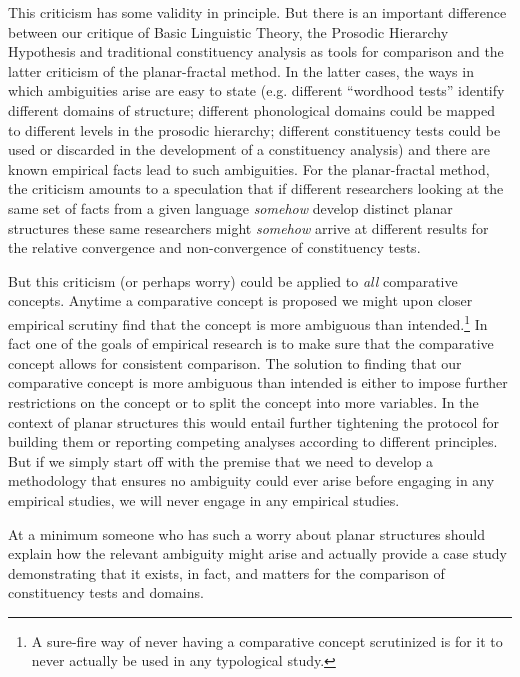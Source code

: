 \documentclass[output=paper,hidelinks]{langscibook}
\begin{document}
This criticism has some validity in principle. But there is an important difference between our critique of Basic Linguistic Theory, the Prosodic Hierarchy Hypothesis and traditional constituency analysis as tools for comparison and the latter criticism of the planar-fractal method. In the latter cases, the ways in which ambiguities arise are easy to state (e.g. different ``wordhood tests'' identify different domains of structure; different phonological domains could be mapped to different levels in the prosodic hierarchy; different constituency tests could be used or discarded in the development of a constituency analysis) and there are known empirical facts lead to such ambiguities. For the planar-fractal method, the criticism amounts to a speculation that if different researchers looking at the same set of facts from a given language \textit{somehow} develop distinct planar structures these same researchers might \textit{somehow} arrive at different results for the relative convergence and non-convergence of constituency tests.

But this criticism (or perhaps worry) could be applied to \textit{all} comparative concepts. Anytime a comparative concept is proposed we might upon closer empirical scrutiny find that the concept is more ambiguous than intended.\footnote{A sure-fire way of never having a comparative concept scrutinized is for it to never actually be used in any typological study.} In fact one of the goals of empirical research is to make sure that the comparative concept allows for consistent comparison. The solution to finding that our comparative concept is more ambiguous than intended is either to impose further restrictions on the concept or to split the concept into more variables. In the context of planar structures this would entail further tightening the protocol for building them or reporting competing analyses according to different principles. But if we simply start off with the premise that we need to develop a methodology that ensures no ambiguity could ever arise before engaging in any empirical studies, we will never engage in any empirical studies. 

At a minimum someone who has such a worry about planar structures should explain how the relevant ambiguity might arise and actually provide a case study demonstrating that it exists, in fact, and matters for the comparison of constit\-u\-en\-cy tests and domains. 

\end{document}
